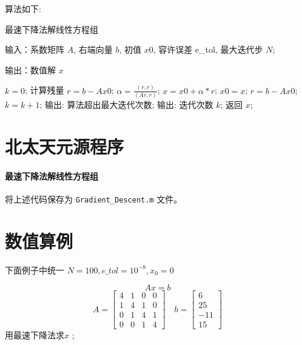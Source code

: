 \documentclass{xtupaper}
\begin{document}
算法如下:

\begin{algorithm}[ht]
  \caption{最速下降法解线性方程组}
  \label{alg:Framwork}
  \begin{algorithmic}
\State 输入：系数矩阵 $A$, 右端向量 $b$, 初值 $x0$, 容许误差 e\_tol, 最大迭代步 $N$;

\State 输出：数值解 $x$

  \State $k=0$;
\State 计算残量 $r=b-Ax0$;
    \State $\alpha=\frac{\left(r,r\right)}{\left(Ar,r\right)}$;
    \State $x = x0 + \alpha * r$;
    \State $x0 = x$;
    \State $r=b-Ax0$;
    \State $k=k+1$;
\EndWhile        
      \State 输出: 算法超出最大迭代次数;
   \Else
      \State 输出: 迭代次数 $k$;
   \EndIf
   \State 返回 $x$;
  \end{algorithmic}
\end{algorithm}


\section{北太天元源程序}
\paragraph{最速下降法解线性方程组}

将上述代码保存为 \verb|Gradient_Descent.m| 文件。

\section{数值算例}
下面例子中统一 $ N=100,e\_tol=10^{-8},x_0 = 0  $ 

\begin{example}
  $$Ax=b$$
  $$
  A=\begin{bmatrix}
  4 & 1 & 0 & 0 \\
  1 & 4 & 1 & 0 \\
  0 & 1 & 4 & 1 \\
  0 & 0 & 1 & 4
  \end{bmatrix}\quad b= \begin{bmatrix}
    6 \\
    25 \\
    -11 \\
    15
    \end{bmatrix}
  $$
  用最速下降法求$ x $ ;
\end{example} 
\end{document}
